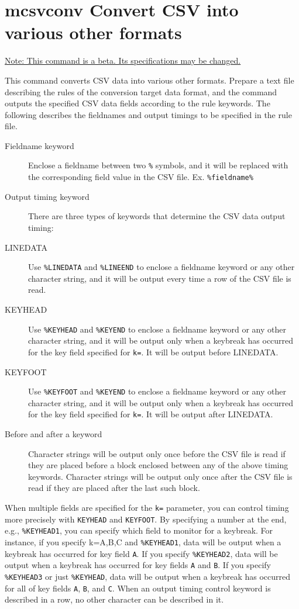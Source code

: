 
%

\section{mcsvconv Convert CSV into various other formats\label{sect:mcsvconv}}
\underline{Note: This command is a beta. Its specifications may be changed.}

This command converts CSV data into various other formats.
Prepare a text file describing the rules of the conversion target data format, and the command outputs the specified CSV data fields according to the rule keywords.
The following describes the fieldnames and output timings to be specified in the rule file.

\begin{description}
 \item[Fieldname keyword] Enclose a fieldname between two \verb|%| symbols, and it will be replaced with the corresponding field value in the CSV file. Ex. \verb|%fieldname%|
 \item[Output timing keyword] There are three types of keywords that determine the CSV data output timing:
 \item[LINEDATA] Use \verb|%LINEDATA| and \verb|%LINEEND| to enclose a fieldname keyword or any other character string, and it will be output every time a row of the CSV file is read.
 \item[KEYHEAD] Use \verb|%KEYHEAD| and \verb|%KEYEND| to enclose a fieldname keyword or any other character string, and it will be output only when a keybreak has occurred for the key field specified for \verb|k=|. It will be output before LINEDATA.
 \item[KEYFOOT] Use \verb|%KEYFOOT| and \verb|%KEYEND| to enclose a fieldname keyword or any other character string, and it will be output only when a keybreak has occurred for the key field specified for \verb|k=|. It will be output after LINEDATA. 
 \item[Before and after a keyword] Character strings will be output only once before the CSV file is read if they are placed before a block enclosed between any of the above timing keywords. Character strings will be output only once after the CSV file is read if they are placed after the last such block.
\end{description}

When multiple fields are specified for the \verb|k=| parameter, you can control timing more precisely with \verb|KEYHEAD| and \verb|KEYFOOT|. By specifying a number at the end, e.g., \verb|%KEYHEAD1|, you can specify which field to monitor for a keybreak. For instance, if you specify k=A,B,C and \verb|%KEYHEAD1|, data will be output when a keybreak has occurred for key field \verb|A|. If you specify \verb|%KEYHEAD2|, data will be output when a keybreak has occurred for key fields \verb|A| and \verb|B|. If you specify \verb|%KEYHEAD3| or just \verb|%KEYHEAD|, data will be output when a keybreak has occurred for all of key fields \verb|A|, \verb|B|, and \verb|C|.
When an output timing control keyword is described in a row, no other character can be described in it.

